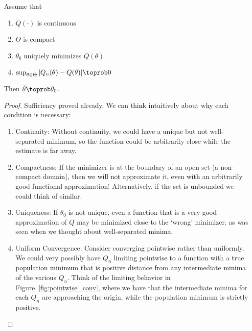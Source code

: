 \documentclass[10pt]{article}
\begin{document}
\begin{theorem}
	 Assume that
	\begin{enumerate}
		\item $Q(\cdot)$ is continuous
		\item $\Theta$ is compact
		\item $\theta_0$ uniquely minimizes $Q(\theta)$
		\item $\sup_{\theta\in\Theta} |Q_n(\theta) - Q(\theta)| \toprob 0$
	\end{enumerate}
	Then $\hat{\theta} \toprob \theta_0$.
\end{theorem}
\begin{proof}
	Sufficiency proved already. We can think intuitively about why each condition is necessary:
	
	\begin{enumerate}
		\item Continuity: Without continuity, we could have a unique but not well-separated minimum, so the function could be arbitrarily close while the estimate is far away.
		\item Compactness: If the minimizer is at the boundary of an open set (\ie a non-compact domain), then we will not approximate it, even with an arbitrarily good functional approximation! Alternatively, if the set is unbounded we could think of similar.
		\item Uniqueness: If $\theta_0$ is not unique, even a function that is a very good approximation of $Q$ may be minimized close to the `wrong' minimizer, as was seen when we thought about well-separated minima.
		\item Uniform Convergence: Consider converging pointwise rather than uniformly. We could very possibly have $Q_n$ limiting pointwise to a function with a true population minimum that is positive distance from any intermediate minima of the various $Q_n$. Think of the limiting behavior in Figure~\ref{fig:pointwise_conv}, where we have that the intermediate minima for each $Q_n$ are approaching the origin, while the population minimum is strictly positive.
	\end{enumerate}
\end{proof}
\end{document}
